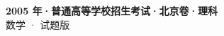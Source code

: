 \documentclass[zihao=-4, a4paper]{ctexart}
\begin{document}
\begin{center}
  {\Large\bfseries 2005 年·普通高等学校招生考试·北京卷·理科}\\[4pt]
  {\large 数学 · 试题版}
\end{center}
\medskip
{}

\end{document}
